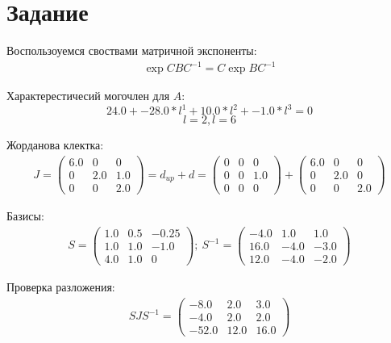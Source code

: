 \section{Задание}
Воспользоуемся своствами матричной экспоненты:
\begin{eqnarray}
    \exp{C B C^{-1}} = C \exp{B} C^{-1} 
\end{eqnarray}

Характерестичесий могочлен для $A$:
\begin{equation}
    24.0 + -28.0*l^1 + 10.0*l^2 + -1.0*l^3 = 0
\end{equation}
\begin{equation}
    l = 2, l = 6
\end{equation}

Жорданова клектка:
\begin{gather}
    J = \begin{pmatrix}
        6.0 & 0 & 0\\ 
        0 & 2.0 & 1.0\\ 
        0 & 0 & 2.0
    \end{pmatrix}
    =
    d_{up} + d
    =
    \begin{pmatrix}
        0 & 0 & 0\\ 
        0 & 0 & 1.0\\ 
        0 & 0 & 0
    \end{pmatrix}
    +
    \begin{pmatrix}
        6.0 & 0 & 0\\ 
        0 & 2.0 & 0\\ 
        0 & 0 & 2.0
    \end{pmatrix}
\end{gather}

Базисы:
\begin{gather}
    S = \begin{pmatrix}
        1.0 & 0.5 & -0.25\\ 
        1.0 & 1.0 & -1.0\\ 
        4.0 & 1.0 & 0
    \end{pmatrix}; \
    S^{-1} = \begin{pmatrix}
        -4.0 & 1.0 & 1.0\\ 
        16.0 & -4.0 & -3.0\\ 
        12.0 & -4.0 & -2.0
    \end{pmatrix}
\end{gather}

Проверка разложения:
\begin{gather}
    SJS^{-1} = 
    \begin{pmatrix}
        -8.0 & 2.0 & 3.0\\ 
        -4.0 & 2.0 & 2.0\\ 
        -52.0 & 12.0 & 16.0
    \end{pmatrix}
\end{gather}

